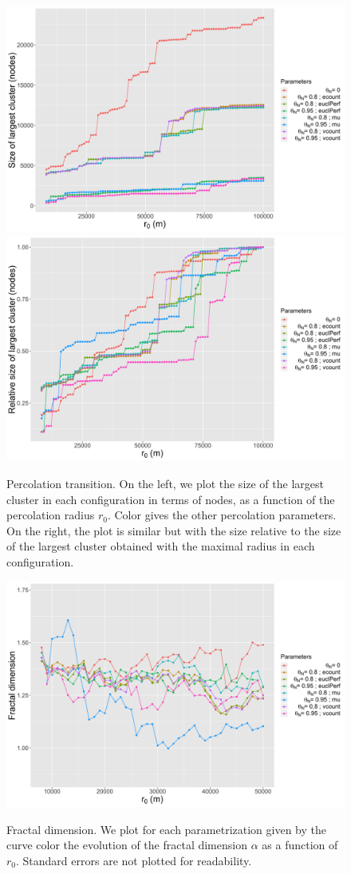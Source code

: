 \documentclass{jimis-en}
\providecommand{\DIFdelend}{} %
\DeclareRobustCommand{\DIFdelend}{\DIFOaddend \let\includegraphics\DIFOincludegraphics} %
\begin{document}
\DIFdelend %
\begin{figure}[ht] 
  {\includegraphics[width=0.49\linewidth]{figures/abssize_nodes.png}}
  {\includegraphics[width=0.49\linewidth]{figures/relsize_nodes.png}}
  \centering
  \caption{Percolation transition. On the left, we plot the size of the largest cluster in each configuration in terms of nodes, as a function of the percolation radius $r_0$. Color gives the other percolation parameters. On the right, the plot is similar but with the size relative to the size of the largest cluster obtained with the maximal radius in each configuration.\label{fig:percolation}}
\end{figure}

\begin{figure}[ht] 
  {\includegraphics[width=\linewidth]{figures/fractaldimension.png}}
  \centering
  \caption{Fractal dimension. We plot for each parametrization given by the curve color the evolution of the fractal dimension $\alpha$ as a function of $r_0$. Standard errors are not plotted for readability.\label{fig:fractaldim}}
\end{figure}
\end{document}

